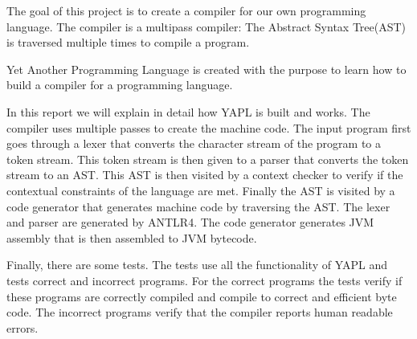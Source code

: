 The goal of this project is to create a compiler for our own programming language. The compiler is a multipass compiler: The Abstract Syntax Tree(AST) is traversed multiple times to compile a program.

Yet Another Programming Language is created with the purpose to learn how to build a compiler for a programming language.

In this report we will explain in detail how YAPL is built and works. The compiler uses multiple passes to create the machine code. The input program first goes through a lexer that converts the character stream of the program to a token stream. This token stream is then given to a parser that converts the token stream to an AST. This AST is then visited by a context checker to verify if the contextual constraints of the language are met. Finally the AST is visited by a code generator that generates machine code by traversing the AST.
The lexer and parser are generated by ANTLR4. The code generator generates JVM assembly that is then assembled to JVM bytecode.

Finally, there are some tests. The tests use all the functionality of YAPL and tests correct and incorrect programs. For the correct programs the tests verify if these programs are correctly compiled and compile to correct and efficient byte code. The incorrect programs verify that the compiler reports human readable errors.